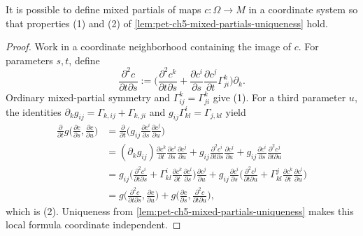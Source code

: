 \begin{theorem}
  \label{thm:pet-ch5-mixed-partials-existence}
  \leanok
  It is possible to define mixed partials of maps $c:\Omega\to M$ in a coordinate
  system so that properties (1) and (2) of \cref{lem:pet-ch5-mixed-partials-uniqueness}
  hold.
\end{theorem}
\begin{proof}
  \leanok
  \sketch
  Work in a coordinate neighborhood containing the image of $c$.  For parameters
  $s,t$, define
  \[
    \frac{\partial^2c}{\partial t\partial s}
    :=\Big(\frac{\partial^2c^k}{\partial t\partial s}+\frac{\partial c^i}{\partial s}\frac{\partial c^j}{\partial t}\Gamma^k_{ji}\Big)\partial_k.
  \]
  Ordinary mixed-partial symmetry and $\Gamma^k_{ij}=\Gamma^k_{ji}$ give (1).
  For a third parameter $u$, the identities
  $\partial_kg_{ij}=\Gamma_{k,ij}+\Gamma_{k,ji}$ and
  $g_{ij}\Gamma^i_{kl}=\Gamma_{j,kl}$ yield
  \begin{align*}
    \frac{\partial}{\partial t}g\Big(\frac{\partial c}{\partial s},\frac{\partial c}{\partial u}\Big)
    &=\frac{\partial}{\partial t}\Big(g_{ij}\frac{\partial c^i}{\partial s}\frac{\partial c^j}{\partial u}\Big)\\
    &=(\partial_kg_{ij})\frac{\partial c^k}{\partial t}\frac{\partial c^i}{\partial s}\frac{\partial c^j}{\partial u}
    +g_{ij}\frac{\partial^2c^i}{\partial t\partial s}\frac{\partial c^j}{\partial u}
    +g_{ij}\frac{\partial c^i}{\partial s}\frac{\partial^2c^j}{\partial t\partial u}\\
    &=g_{ij}\Big(\frac{\partial^2c^i}{\partial t\partial s}+\Gamma^i_{kl}\frac{\partial c^k}{\partial t}\frac{\partial c^l}{\partial s}\Big)\frac{\partial c^j}{\partial u}
    +g_{ij}\frac{\partial c^i}{\partial s}\Big(\frac{\partial^2c^j}{\partial t\partial u}+\Gamma^j_{kl}\frac{\partial c^k}{\partial t}\frac{\partial c^l}{\partial u}\Big)\\
    &=g\Big(\frac{\partial^2c}{\partial t\partial s},\frac{\partial c}{\partial u}\Big)
    +g\Big(\frac{\partial c}{\partial s},\frac{\partial^2c}{\partial t\partial u}\Big),
  \end{align*}
  which is (2).  Uniqueness from
  \cref{lem:pet-ch5-mixed-partials-uniqueness} makes this local formula
  coordinate independent.
\end{proof}

